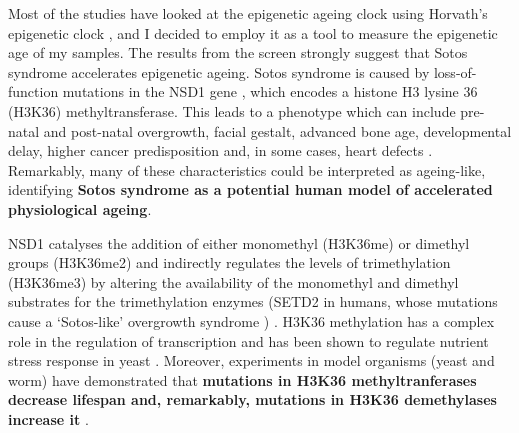 \bigskip

Most of the studies have looked at the epigenetic ageing clock using Horvath’s epigenetic clock \cite{Horvath2013}, and I decided to employ it as a tool to measure the epigenetic age of my samples. The results from the screen strongly suggest that Sotos syndrome accelerates epigenetic ageing. Sotos syndrome is caused by loss-of-function mutations in the NSD1 gene \cite{Choufani2015,Kurotaki2002}, which encodes a histone H3 lysine 36 (\acrshort{H3K36}) methyltransferase. This leads to a phenotype which can include pre-natal and post-natal overgrowth, facial gestalt, advanced bone age, developmental delay, higher cancer predisposition and, in some cases, heart defects \cite{Leventopoulos2009}. Remarkably, many of these characteristics could be interpreted as ageing-like, identifying \textbf{Sotos syndrome as a potential human model of accelerated physiological ageing}.

\bigskip

NSD1 catalyses the addition of either monomethyl (H3K36me) or dimethyl groups (H3K36me2) and indirectly regulates the levels of trimethylation (\acrshort{H3K36me3}) by altering the availability of the monomethyl and dimethyl substrates for the trimethylation enzymes (SETD2 in humans, whose mutations cause a `Sotos-like' overgrowth syndrome ) \cite{Wagner2012,Luscan2014}. H3K36 methylation has a complex role in the regulation of transcription \cite{Wagner2012} and has been shown to regulate nutrient stress response in yeast \cite{McDaniel2017}. Moreover, experiments in model organisms (yeast and worm) have demonstrated that \textbf{mutations in H3K36 methyltranferases decrease lifespan and, remarkably, mutations in H3K36 demethylases increase it} \cite{Ni2012,Sen2015,Pu2015}.

\bigskip

